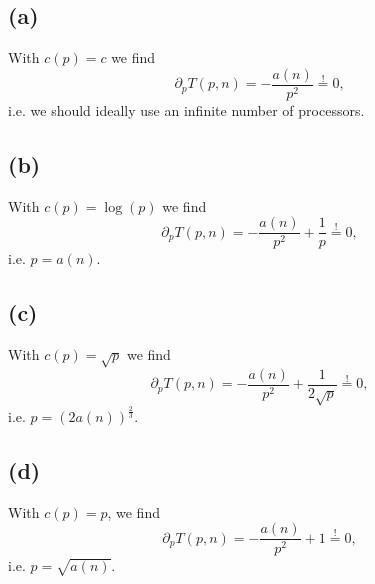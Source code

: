 \subsection*{(a)}
With $c(p) = c$ we find
\[
\partial_p T(p, n) = - \frac{a(n)}{p^{2}} \overset{!}{=} 0, 
\]
i.e. we should ideally use an infinite number of processors.

\subsection*{(b)}
With $c(p) = \log(p)$ we find
\[
\partial_p T(p, n) = - \frac{a(n)}{p^{2}} + \frac{1}{p} \overset{!}{=} 0, 
\]
i.e. $p = a(n)$.

\subsection*{(c)}
With $c(p) = \sqrt{p}$ we find
\[
\partial_p T(p, n) = - \frac{a(n)}{p^{2}} + \frac{1}{2 \sqrt{p}} \overset{!}{=} 0, 
\]
i.e. $p = (2a(n))^{\frac{2}{3}}$.

\subsection*{(d)}
With $c(p) = p$, we find
\[
\partial_p T(p, n) = - \frac{a(n)}{p^{2}} + 1 \overset{!}{=} 0, 
\]
i.e. $p = \sqrt{a(n)}$.
